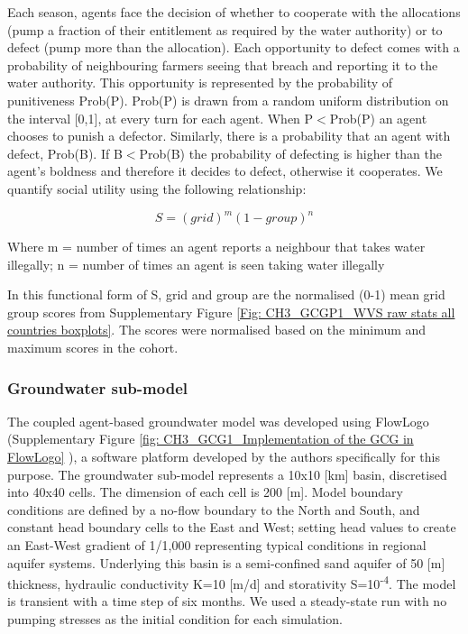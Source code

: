 \documentclass[12pt, a4paper]{article}
\begin{document}
Each season, agents face the decision of whether to cooperate with the allocations (pump a fraction of their entitlement as required by the water authority) or to defect (pump more than the allocation). Each opportunity to defect comes with a probability of neighbouring farmers seeing that breach and reporting it to the water authority. This opportunity is represented by the probability of punitiveness Prob(P). Prob(P) is drawn from a random uniform distribution on the interval [0,1], at every turn for each agent. When P$<$Prob(P) an agent chooses to punish a defector. Similarly, there is a probability that an agent with defect, Prob(B). If B$<$Prob(B) the probability of defecting is higher than the agent’s boldness and therefore it decides to defect, otherwise it cooperates. We quantify social utility using the following relationship:

\begin{equation}
	S = {(grid)}^{m}{(1-group)}^{n}
\end{equation}

Where m = number of times an agent reports a neighbour that takes water illegally; n = number of times an agent is seen taking water illegally

In this functional form of S, grid and group are the normalised (0-1) mean grid group scores from Supplementary Figure \ref{Fig: CH3_GCGP1_WVS raw stats all countries boxplots}. The scores were normalised based on the minimum and maximum scores in the cohort.

\subsubsection{Groundwater sub-model}

The coupled agent-based groundwater model was developed using FlowLogo \autocite{CastillaRho:2015dr} (Supplementary Figure \ref{fig: CH3_GCG1_Implementation of the GCG in FlowLogo} ), a software platform developed by the authors specifically for this purpose. The groundwater sub-model represents a 10x10 [km] basin, discretised into 40x40 cells. The dimension of each cell is 200 [m]. Model boundary conditions are defined by a no-flow boundary to the North and South, and constant head boundary cells to the East and West; setting head values to create an East-West gradient of 1/1,000 representing typical conditions in regional aquifer systems. Underlying this basin is a semi-confined sand aquifer of 50 [m] thickness, hydraulic conductivity K=10 [m/d] and storativity S=10\textsuperscript{-4}. The model is transient with a time step of six months. We used a steady-state run with no pumping stresses as the initial condition for each simulation. 
\end{document}
